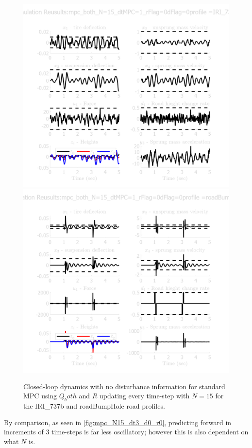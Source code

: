 \documentclass[]{IEEEtran}
\begin{document}
\begin{figure}[h]
    \centering
    \includegraphics[width = 0.49 \columnwidth]{figs/results_mpc_both_N=15_dtMPC=1_rFlag=0_dFlag=0_IRI_737b.png}
    \includegraphics[width = 0.49 \columnwidth]{figs/results_mpc_both_N=15_dtMPC=1_rFlag=0_dFlag=0_roadBumpHole.png}
    \caption{Closed-loop dynamics with no disturbance information for standard MPC using $Q_both$ and $R$ updating every time-step with $N=15$ for the IRI\_737b and roadBumpHole road profiles.} \label{fig:mpc_N15_dt1_d0_r0}
\end{figure}

By comparison, as seen in \autoref{fig:mpc_N15_dt3_d0_r0}, predicting forward in increments of 3 time-steps is far less oscillatory; however this is also dependent on what $N$ is.
\end{document}
